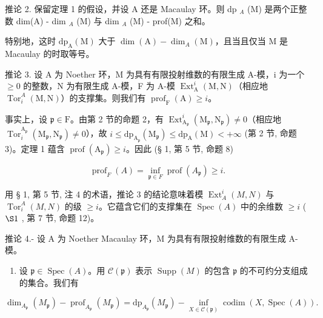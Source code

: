 推论 2. 保留定理 1 的假设，并设 A 还是 Macaulay 环。则 dp \(_{A}\) (M) 是两个正整数 dim(A) - dim \(_{A}\) (M) 与 dim \(_{A}\) (M) - prof(M) 之和。

特别地，这时 \(\mathrm{dp}_{\mathrm{A}}(\mathrm{M})\) 大于 \(\dim (\mathrm{A}) - \dim_{A}(\mathrm{M})\)，且当且仅当 M 是 Macaulay 的时取等号。

推论 3. 设 A 为 Noether 环，M 为具有有限投射维数的有限生成 A-模，i 为一个 \(\geqslant 0\) 的整数，N 为有限生成 A-模，F 为 A-模 \(\operatorname{Ext}_{\mathrm{A}}^{i}(\mathrm{M},\mathrm{N})\)（相应地 \(\operatorname{Tor}_{i}^{A}(\mathrm{M},\mathrm{N})\)）的支撑集。则我们有 \(\operatorname{prof}_{\mathrm{F}}(\mathrm{A}) \geqslant i\)。

事实上，设 \(\mathfrak{p} \in \mathrm{F}\)。由第 2 节的命题 2，有 \(\operatorname{Ext}_{\mathrm{A}_{\mathfrak{p}}}^{i}(\mathrm{M}_{\mathfrak{p}}, \mathrm{N}_{\mathfrak{p}}) \neq 0\)（相应地 \(\operatorname{Tor}_{i}^{\mathrm{A}_{\mathfrak{p}}}(\mathrm{M}_{\mathfrak{p}}, \mathrm{N}_{\mathfrak{p}}) \neq 0\)），故 \(i \leqslant \mathrm{dp}_{\mathrm{A}_{\mathfrak{p}}}(\mathrm{M}_{\mathfrak{p}}) \leqslant \mathrm{dp}_{\mathrm{A}}(\mathrm{M}) < +\infty\) (第 2 节, 命题 3)。定理 1 蕴含 \(\operatorname{prof}(\mathrm{A}_{\mathfrak{p}}) \geqslant i\)。因此 (§ 1, 第 5 节, 命题 8)

\[
\operatorname{prof} _ {F} (A) = \inf _ {\mathfrak {p} \in F} \operatorname{prof} (A _ {\mathfrak {p}}) \geqslant i.
\]

用 § 1, 第 5 节, 注 4 的术语，推论 3 的结论意味着模 \(\operatorname{Ext}_{A}^{i}(M,N)\) 与 \(\operatorname{Tor}_{i}^{A}(M,N)\) 的级 \(\geqslant i\)。它蕴含它们的支撑集在 \(\operatorname{Spec}(A)\) 中的余维数 \(\geqslant i\) ( \(\S 1\) , 第 7 节, 命题 12)。

推论 4.- 设 A 为 Noether Macaulay 环，M 为具有有限投射维数的有限生成 A-模。

\begin{enumerate}
\def\labelenumi{\alph{enumi})}
\tightlist
\item
  设 \(\mathfrak{p} \in \operatorname{Spec}(A)\)。用 \(\mathcal{C}(\mathfrak{p})\) 表示 \(\operatorname{Supp}(M)\) 的包含 \(\mathfrak{p}\) 的不可约分支组成的集合。我们有
\end{enumerate}

\[
\dim_ {A _ {\mathfrak {p}}} \left(M _ {\mathfrak {p}}\right) - \operatorname{prof} _ {A _ {\mathfrak {p}}} \left(M _ {\mathfrak {p}}\right) = \mathrm{dp} _ {A _ {\mathfrak {p}}} \left(M _ {\mathfrak {p}}\right) - \inf _ {X \in \mathscr {C} (\mathfrak {p})} \operatorname{codim} (X, \operatorname{Spec} (A)).
\]

